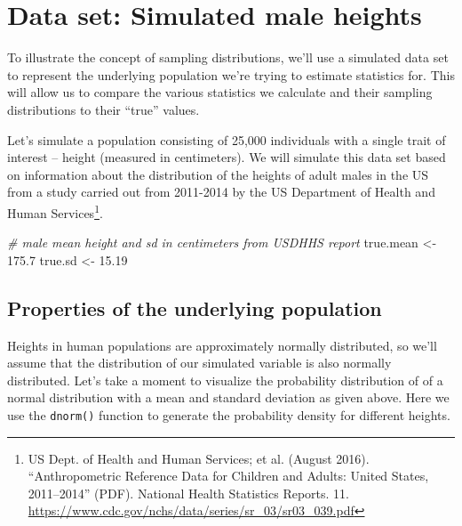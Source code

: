 \documentclass[]{book}
\newenvironment{Shaded}{\begin{snugshade}}{\end{snugshade}}
\newcommand{\CommentTok}[1]{\textcolor[rgb]{0.56,0.35,0.01}{\textit{#1}}}
\newcommand{\FloatTok}[1]{\textcolor[rgb]{0.00,0.00,0.81}{#1}}
\newcommand{\NormalTok}[1]{#1}
\newcommand{\StringTok}[1]{\textcolor[rgb]{0.31,0.60,0.02}{#1}}
\let\rmarkdownfootnote\footnote%
\def\footnote{\protect\rmarkdownfootnote}
\theoremstyle{definition}
\theoremstyle{definition}
\theoremstyle{definition}
\theoremstyle{remark}
\begin{document}
\hypertarget{data-set-simulated-male-heights}{%
\section{Data set: Simulated male
heights}\label{data-set-simulated-male-heights}}

To illustrate the concept of sampling distributions, we'll use a
simulated data set to represent the underlying population we're trying
to estimate statistics for. This will allow us to compare the various
statistics we calculate and their sampling distributions to their
``true'' values.

Let's simulate a population consisting of 25,000 individuals with a
single trait of interest -- height (measured in centimeters). We will
simulate this data set based on information about the distribution of
the heights of adult males in the US from a study carried out from
2011-2014 by the US Department of Health and Human Services\footnote{US
  Dept. of Health and Human Services; et al. (August 2016).
  ``Anthropometric Reference Data for Children and Adults: United
  States, 2011--2014'' (PDF). National Health Statistics Reports. 11.
  \url{https://www.cdc.gov/nchs/data/series/sr_03/sr03_039.pdf}}.

\begin{Shaded}
\begin{Highlighting}[]
\CommentTok{# male mean height and sd in centimeters from USDHHS report}
\NormalTok{true.mean <-}\StringTok{ }\FloatTok{175.7}
\NormalTok{true.sd <-}\StringTok{ }\FloatTok{15.19}
\end{Highlighting}
\end{Shaded}

\hypertarget{properties-of-the-underlying-population}{%
\subsection{Properties of the underlying
population}\label{properties-of-the-underlying-population}}

Heights in human populations are approximately normally distributed, so
we'll assume that the distribution of our simulated variable is also
normally distributed. Let's take a moment to visualize the probability
distribution of of a normal distribution with a mean and standard
deviation as given above. Here we use the \texttt{dnorm()} function to
generate the probability density for different heights.
\end{document}
